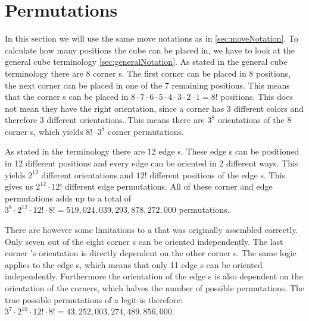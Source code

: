 \section{Permutations}
\label{sec:permutations}
In this section we will use the same move notations as in \ref{sec:moveNotation}.
To calculate how many positions the cube can be placed in, we have to look at the general cube terminology \ref{sec:generalNotation}.
As stated in the general cube terminology there are 8 corner \cpiece{}s. The first corner \cpiece{} can be placed in 8 positions, the next corner \cpiece{} can be placed in one of the 7 remaining positions. %
This means that the corner \cpiece{}s can be placed in $8\cdot7\cdot6\cdot5\cdot4\cdot3\cdot2\cdot1=8!$ positions. 
This does not mean they have the right orientation, since a corner \cpiece{} has 3 different colors and therefore 3 different orientations. This means there are $3^8$ orientations of the 8 corner \cpiece{}s, which yields $8!\cdot3^8$ corner permutations. 

As stated in the terminology there are 12 edge \cpiece{}s. These edge \cpiece{}s can be positioned in 12 different positions and every edge \cpiece{} can be oriented in 2 different ways. This yields $2^12$ different orientations and $12!$ different positions of the edge \cpiece{}s. This gives us $2^{12}\cdot12!$ different edge permutations. All of these corner and edge permutations adds up to a total of  $3^8\cdot2^{12}\cdot12!\cdot8!=519,024,039,293,878,272,000$ permutations.

There are however some limitations to a \rubik{} that was originally assembled correctly. 
Only seven out of the eight corner \cpiece{}s can be oriented independently. 
The last corner \cpiece{}'s orientation is directly dependent on the other corner \cpiece{}s. 
The same logic applies to the edge \cpiece{}s, which means that only 11 edge \cpiece{}s can be oriented independently.
Furthermore the orientation of the edge \cpiece{}s is also dependent on the orientation of the corners, which halves the number of possible permutations.
The true possible permutations of a legit \rubik{} is therefore:
$3^7\cdot2^{10}\cdot12!\cdot8!=43,252,003,274,489,856,000$.